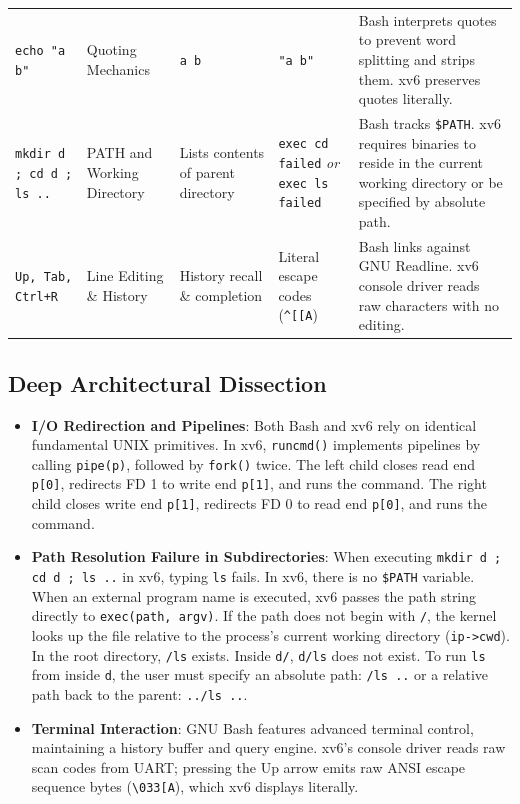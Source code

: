\documentclass[12pt,a4paper]{article}
\begin{document}
\begin{table}[H]
\begin{tabularx}{\textwidth}{p{3.2cm} p{1.8cm} p{2.6cm} p{2.8cm} X}
\addlinespace
\texttt{echo "a b"} & Quoting Mechanics & \texttt{a b} & \texttt{"a b"} & Bash interprets quotes to prevent word splitting and strips them. xv6 preserves quotes literally. \\
\addlinespace
\texttt{mkdir d ; cd d ; ls ..} & PATH and Working Directory & Lists contents of parent directory & \texttt{exec cd failed} \newline \textit{or} \texttt{exec ls failed} & Bash tracks \texttt{\$PATH}. xv6 requires binaries to reside in the current working directory or be specified by absolute path. \\
\addlinespace
\texttt{Up, Tab, Ctrl+R} & Line Editing \& History & History recall \& completion & Literal escape codes (\texttt{\^{}[[A}) & Bash links against GNU Readline. xv6 console driver reads raw characters with no editing. \\
\bottomrule
\end{tabularx}
\end{table}

\subsection{Deep Architectural Dissection}
\begin{itemize}
    \item \textbf{I/O Redirection and Pipelines}: Both Bash and xv6 rely on identical fundamental UNIX primitives. In xv6, \texttt{runcmd()} implements pipelines by calling \texttt{pipe(p)}, followed by \texttt{fork()} twice. The left child closes read end \texttt{p[0]}, redirects FD 1 to write end \texttt{p[1]}, and runs the command. The right child closes write end \texttt{p[1]}, redirects FD 0 to read end \texttt{p[0]}, and runs the command.
    \item \textbf{Path Resolution Failure in Subdirectories}: When executing \texttt{mkdir d ; cd d ; ls ..} in xv6, typing \texttt{ls} fails. In xv6, there is no \texttt{\$PATH} variable. When an external program name is executed, xv6 passes the path string directly to \texttt{exec(path, argv)}. If the path does not begin with \texttt{/}, the kernel looks up the file relative to the process's current working directory (\texttt{ip->cwd}). In the root directory, \texttt{/ls} exists. Inside \texttt{d/}, \texttt{d/ls} does not exist. To run \texttt{ls} from inside \texttt{d}, the user must specify an absolute path: \texttt{/ls ..} or a relative path back to the parent: \texttt{../ls ..}.
    \item \textbf{Terminal Interaction}: GNU Bash features advanced terminal control, maintaining a history buffer and query engine. xv6's console driver reads raw scan codes from UART; pressing the Up arrow emits raw ANSI escape sequence bytes (\texttt{\textbackslash033[A}), which xv6 displays literally.
\end{itemize}
\end{document}
